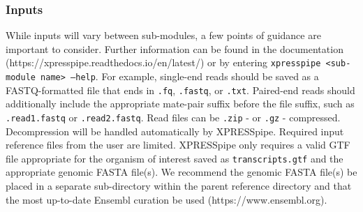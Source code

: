 \documentclass[10pt, oneside]{article}
\begin{document}
\subsubsection{Inputs}
While inputs will vary between sub-modules, a few points of guidance are important to consider. Further information can be found in the documentation (https://xpresspipe.readthedocs.io/en/latest/) or by entering \texttt{xpresspipe \textless sub-module name\textgreater \ --help}. For example, single-end reads should be saved as a FASTQ-formatted file that ends in \texttt{.fq}, \texttt{.fastq}, or \texttt{.txt}. Paired-end reads should additionally include the appropriate mate-pair suffix before the file suffix, such as \texttt{.read1.fastq} or \texttt{.read2.fastq}. Read files can be \texttt{.zip} - or \texttt{.gz} - compressed. Decompression will be handled automatically by XPRESSpipe. Required input reference files from the user are limited. XPRESSpipe only requires a valid GTF file appropriate for the organism of interest saved as \texttt{transcripts.gtf} and the appropriate genomic FASTA file(s). We recommend the genomic FASTA file(s) be placed in a separate sub-directory within the parent reference directory and that the most up-to-date Ensembl curation be used (https://www.ensembl.org).
\end{document}
